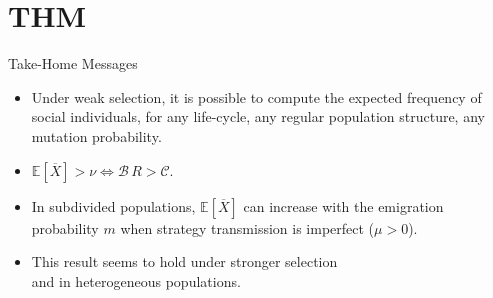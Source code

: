 \documentclass[aspectratio=169]{beamer}
\begin{document}
\section{THM}


\begin{frame}{Take-Home Messages}


\begin{center}
\begin{minipage}{0.9\textwidth}

\begin{itemize}
\item<+-> Under weak selection, it is
possible to compute the expected frequency of social
individuals, for any life-cycle, any regular population structure,  any mutation probability. 

\item<+-> $\mathbb{E}[\overline{X}]>\nu \Leftrightarrow \mathcal{B}\, R > \mathcal{C}$.

\item<+-> In subdivided populations, $\mathbb{E}[\overline{X}]$ can increase with the emigration probability $m$ when strategy transmission is imperfect ($\mu > 0$).  


\item<+-> This result seems to hold under stronger selection \\and in heterogeneous populations.
\end{itemize}
\end{minipage}
\end{center}


\end{frame}
\end{document}

